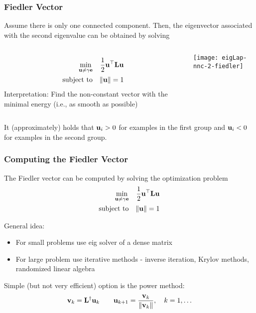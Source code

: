 \documentclass[12pt,handout]{beamer}
\begin{document}
\begin{frame}
\frametitle{Fiedler Vector}

	Assume there is only one connected component. Then, the eigenvector associated with the second eigenvalue can be obtained by solving
	
\begin{columns}
	\begin{eqnarray*}
	\min_{{\bf u}\not=\gamma{\bf e}} && {\frac 12} {\bf u}^{\top} {\bf L} {\bf u} \\
	\text{subject to} && \|{\bf u} \| = 1
	\end{eqnarray*}
	Interpretation: Find the non-constant vector with the minimal energy  (i.e., as smooth as possible)


	\bigskip

	
	\texttt{[image: eigLap-nnc-2-fiedler]} \\ 
\end{columns}
	It (approximately) holds that ${\bf u}_i > 0$ for examples in the first group and ${\bf u}_i<0$ for examples in the second group.



\end{frame}

\begin{frame}
\frametitle{Computing the Fiedler Vector}


The Fiedler vector can be computed by solving the optimization problem
\begin{eqnarray*}
\min_{{\bf u}\not=\gamma{\bf e}} && {\frac 12} {\bf u}^{\top} {\bf L} {\bf u} \\
\text{subject to} && \|{\bf u} \| = 1
\end{eqnarray*}


\bigskip

General idea:
\begin{itemize}
\item
For small problems use eig solver of a dense matrix
\item
For large problem use iterative methods - inverse iteration, Krylov methods, randomized linear algebra
\end{itemize}

\bigskip

Simple (but not very efficient) option is the power method:
$$ {\bf v}_{k} = {\bf L}^{\dag} {\bf u}_k \quad \quad {\bf u}_{k+1} = {\frac {{\bf v}_k}{\|{\bf v}_k\|}},\quad k=1,\ldots $$


\end{frame}
\end{document}
